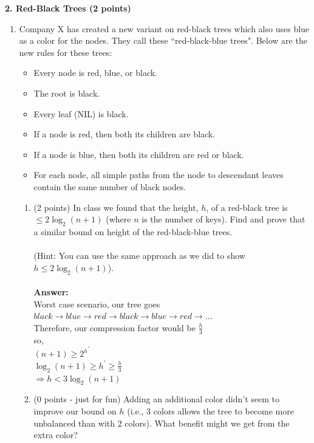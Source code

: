 \documentclass[12pt]{elsart}
\begin{document}
{\bf 2.  Red-Black Trees (2 points)}

\begin{enumerate}
\item Company X has created a new variant on red-black trees which also uses blue as a color for the nodes.  They call these ``red-black-blue trees".  Below are the new rules for these trees:\\

\begin{itemize}
   \item Every node is red, blue, or black.
   \item  The root is black.
   \item Every leaf (NIL) is black.
   \item If a node is red, then both its children are black.
   \item If a node is blue, then both its children are red or black.
   \item For each node, all simple paths from the node to descendant leaves contain the
same number of black nodes.\\
\end{itemize}
\newpage
\begin{enumerate}
   \item (2 points) In class we found that the height, $h$, of a red-black tree is $\leq 2\log_2(n+1)$ (where $n$ is the number of keys).  Find and prove that a similar bound on height of the red-black-blue trees.
\\\\(Hint: You can use the same approach as we did to show\\ $h \leq 2\log_2(n+1)$).\\\\
	{\bf Answer:}\\
	Worst case scenario, our tree goes $black \rightarrow blue \rightarrow red \rightarrow black \rightarrow blue \rightarrow red \rightarrow \ldots$\\
	Therefore, our compression factor would be $\frac{h}{3}$\\
	so,\\ 
	$(n+1) \geq {2^h}^\prime$\\
	$\log_2{(n+1)} \geq h^\prime \geq \frac{h}{3}$\\
	$\boxed{\Rightarrow h \lt 3\log_2{(n+1)}}$\\

   \item (0 points - just for fun) Adding an additional color didn't seem to improve our bound on $h$ (i.e., 3 colors allows the tree to become more unbalanced than with 2 colors).    What benefit might we get from the extra color?
\end{enumerate}

\end{enumerate}
\end{document}
